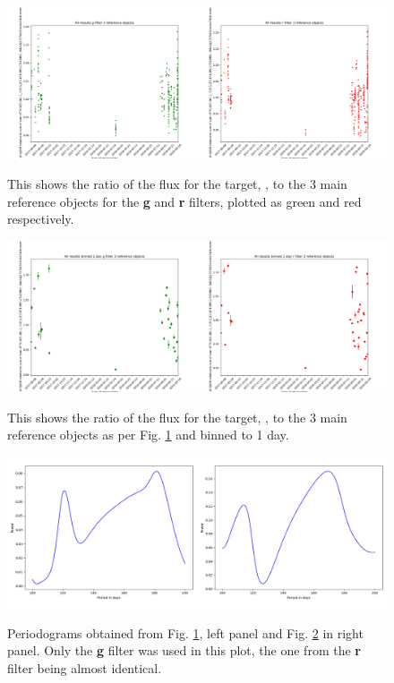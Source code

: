 \begin{figure}[!htbp]
\begin{center}
\includegraphics[scale=0.25]{images/allref123.png}
\end{center}   
\caption{This shows the ratio of the flux for the target, \bstar, to the 3 main reference objects for the \textbf{g} and
\textbf{r} filters, plotted as green and red respectively.}
  \protect\label{fig:allref123}
\end{figure}

\begin{figure}[!htbp]
\begin{center}
\includegraphics[scale=0.25]{images/allref123bin.png}
\end{center}   
\caption{This shows the ratio of the flux for the target, \bstar, to the 3 main reference objects as per Fig. \ref{fig:allref123} and binned to 1 day.}
  \protect\label{fig:allref123bin}
\end{figure}

\begin{figure}[!htbp]
\begin{center}
\includegraphics[scale=0.25]{images/ls123both.png}
\end{center}   
\caption{Periodograms obtained from Fig. \ref{fig:allref123}, left panel and Fig. \ref{fig:allref123bin} in right
  panel. Only the \textbf{g} filter was used in this plot, the one from the \textbf{r} filter being almost identical.}
  \protect\label{fig:ls123both}
\end{figure}

